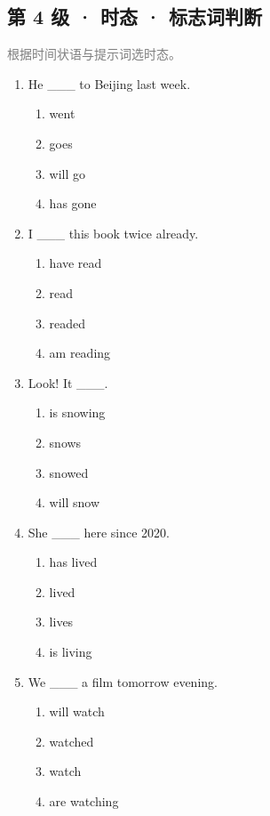 \documentclass[11pt,a4paper]{ctexart}
\begin{document}
\subsection*{第 4 级 · 时态 · 标志词判断}
\noindent\textcolor{gray}{根据时间状语与提示词选时态。}\par\smallskip
\begin{enumerate}[leftmargin=*,itemsep=4pt]
\item He \_\_\_ to Beijing last week.
\begin{enumerate}[label=\Alph*.,leftmargin=2em,itemsep=1pt,topsep=2pt]
\item went
\item goes
\item will go
\item has gone
\end{enumerate}
\item I \_\_\_ this book twice already.
\begin{enumerate}[label=\Alph*.,leftmargin=2em,itemsep=1pt,topsep=2pt]
\item have read
\item read
\item readed
\item am reading
\end{enumerate}
\item Look! It \_\_\_.
\begin{enumerate}[label=\Alph*.,leftmargin=2em,itemsep=1pt,topsep=2pt]
\item is snowing
\item snows
\item snowed
\item will snow
\end{enumerate}
\item She \_\_\_ here since 2020.
\begin{enumerate}[label=\Alph*.,leftmargin=2em,itemsep=1pt,topsep=2pt]
\item has lived
\item lived
\item lives
\item is living
\end{enumerate}
\item We \_\_\_ a film tomorrow evening.
\begin{enumerate}[label=\Alph*.,leftmargin=2em,itemsep=1pt,topsep=2pt]
\item will watch
\item watched
\item watch
\item are watching

\end{enumerate}
\end{enumerate}
\end{document}
